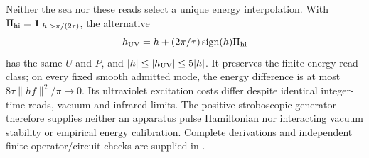 Neither the sea nor these reads select a unique energy interpolation.
With $\Pi_{\rm hi}=\mathbf1_{|h|>\pi/(2\tau)}$, the alternative
\[
 h_{\rm UV}=h+(2\pi/\tau)\operatorname{sign}(h)\Pi_{\rm hi}
\]
has the same $U$ and $P$, and $|h|\le|h_{\rm UV}|\le5|h|$.
It preserves the finite-energy read class; on every fixed smooth admitted
mode, the energy difference is at most $8\tau\|hf\|^2/\pi\to0$.
Its ultraviolet excitation costs differ despite identical integer-time
reads, vacuum and infrared limits. The positive stroboscopic generator
therefore supplies neither an apparatus pulse Hamiltonian nor interacting
vacuum stability or empirical energy calibration. Complete derivations and
independent finite operator/circuit checks are supplied in
.
